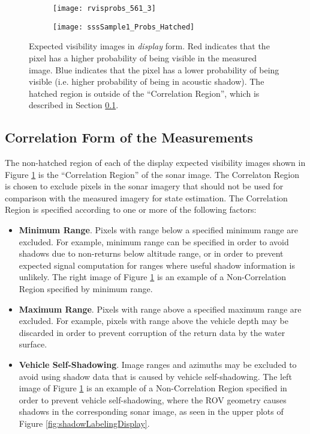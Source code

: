 \begin{figure}[!h]
	\centering
	\begin{subfigure}[b]{0.378\textwidth}
                \texttt{[image: rvisprobs\_561\_3]}
                \caption{}
  	\end{subfigure}
 	\hspace{5ex}
  	\centering
	\begin{subfigure}[b]{0.545\textwidth}
                \texttt{[image: sssSample1\_Probs\_Hatched]}
                \caption{}
  	\end{subfigure}
	\caption{Expected visibility images in \emph{display} form. Red indicates that the pixel has a higher probability of being visible in the measured image. Blue indicates that the pixel has a lower probability of being visible (i.e. higher probability of being in acoustic shadow). The hatched region is outside of the ``Correlation Region'', which is described in Section \ref{framework.Measurement.Correlation}. }	
	\label{fig:expSignals}
\end{figure}

\subsection{Correlation Form of the Measurements}
\label{framework.Measurement.Correlation}

The non-hatched region of each of the display expected visibility images shown in Figure \ref{fig:expSignals} is the ``Correlation Region'' of the sonar image.
The Correlaton Region is chosen to exclude pixels in the sonar imagery that should not be used for comparison with the measured imagery for state estimation.
The Correlation Region is specified according to one or more of the following factors:

\begin{itemize}
\item \textbf{Minimum Range}. Pixels with range below a specified minimum range are excluded. For example, minimum range can be specified in order to avoid shadows due to non-returns below altitude range, or in order to prevent expected signal computation for ranges where useful shadow information is unlikely.  The right image of Figure \ref{fig:expSignals} is an example of a Non-Correlation Region specified by minimum range.

\item \textbf{Maximum Range}. Pixels with range above a specified maximum range are excluded. For example, pixels with range above the vehicle depth may be discarded in order to prevent corruption of the return data by the water surface.

\item \textbf{Vehicle Self-Shadowing}. Image ranges and azimuths may be excluded to avoid using shadow data that is caused by vehicle self-shadowing.  The left image of Figure \ref{fig:expSignals} is an example of a Non-Correlation Region specified in order to prevent vehicle self-shadowing, where the ROV geometry causes shadows in the corresponding sonar image, as seen in the upper plots of Figure \ref{fig:shadowLabelingDisplay}.

\end{itemize}

